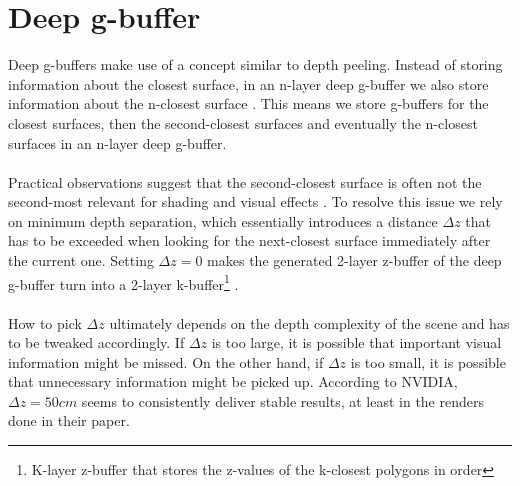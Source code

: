 \documentclass{ACGSeminar}
\begin{document}
\section{Deep g-buffer}
	Deep g-buffers make use of a concept similar to depth peeling. Instead of storing information about the closest surface, in an n-layer deep g-buffer we also store information about the n-closest surface \cite{Mara2016DeepGBuffer}. This means we store g-buffers for the closest surfaces, then the second-closest surfaces and eventually the n-closest surfaces in an n-layer deep g-buffer. \\\\
	Practical observations suggest that the second-closest surface is often not the second-most relevant for shading and visual effects \cite{Mara2016DeepGBuffer}. To resolve this issue we rely on minimum depth separation, which essentially introduces a distance $\Delta z$ that has to be exceeded when looking for the next-closest surface immediately after the current one. Setting $\Delta z = 0$ makes the generated 2-layer z-buffer of the deep g-buffer turn into a 2-layer k-buffer\footnote{K-layer z-buffer that stores the z-values of the k-closest polygons in order} \cite{MFEKB}. \\\\
	How to pick $\Delta z$ ultimately depends on the depth complexity of the scene and has to be tweaked accordingly. If $\Delta z$ is too large, it is possible that important visual information might be missed. On the other hand, if $\Delta z$ is too small, it is possible that unnecessary information might be picked up. According to NVIDIA, $\Delta z = 50cm$ seems to consistently deliver stable results, at least in the renders done in their paper.
\end{document}
